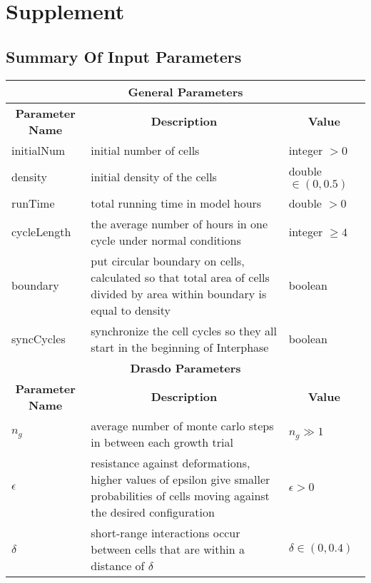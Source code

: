 \documentclass{article}
\begin{document}
\newpage
\section{Supplement}
\subsection{Summary Of Input Parameters}
\begin{tabular}{|m{4cm}||m{8cm}||m{5cm}|}
	\hline
	\multicolumn{3}{|c|}{\textbf{General Parameters}}\\ 
	\hline
	\multicolumn{1}{|c||}{\textbf{Parameter Name}}
	&  \multicolumn{1}{c||}{\textbf{Description}}
	&  \multicolumn{1}{c|}{\textbf{Value}}\\
	\hhline{|=||=||=|}
	initialNum & initial number of cells & integer $> 0$\\
	\hline
	density & initial density of the cells & double $\in(0, 0.5)$\\
	\hline
	runTime & total running time in model hours & double $> 0$\\
	\hline
	cycleLength & the average number of hours in one cycle under
	normal conditions & integer $\geq 4$\\
	\hline
	boundary & put circular boundary on cells, calculated
	so that total area of cells divided by area within boundary
	is equal to density & boolean\\
	\hline
	syncCycles & synchronize the cell cycles so they all
	start in the beginning of Interphase & boolean\\
	\hline
	\multicolumn{3}{|c|}{\textbf{Drasdo Parameters}}\\ 
	\hline
	\multicolumn{1}{|c||}{\textbf{Parameter Name}}
	&  \multicolumn{1}{c||}{\textbf{Description}}
	&  \multicolumn{1}{c|}{\textbf{Value}}\\
	\hhline{|=||=||=|}
	$n_g$ & average number of monte carlo steps in between each
	growth trial & $n_g \gg 1$\\
	\hline
	$\epsilon$ & resistance against deformations, higher values of
	epsilon give smaller probabilities of cells moving against
	the desired configuration & $\epsilon > 0$\\
	\hline
	$\delta$ & short-range interactions occur between cells that
	are within a distance of $\delta$ & $\delta\in (0, 0.4)$\\
	\hline
\end{tabular}
\\
\end{document}
